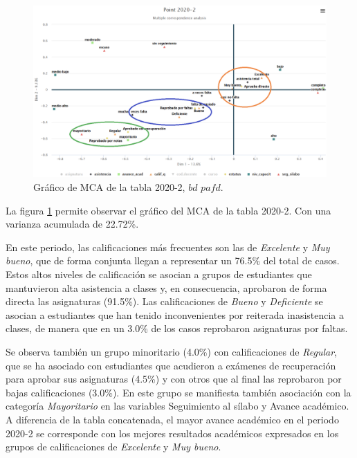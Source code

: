 \documentclass[mathematics,article,submit,moreauthors,pdftex]{mdpi}
\begin{document}
\begin{figure}[H]


\begin{center}\includegraphics[width=0.9\linewidth,]{point_2022_2} \end{center}

\caption{Gráfico de MCA de la tabla 2020-2, $bd$ $pafd$.}
\label{fig:point_2022_2}
\end{figure}

La figura \ref{fig:point_2022_2} permite observar el gráfico del MCA de
la tabla 2020-2. Con una varianza acumulada de 22.72\%.

En este periodo, las calificaciones más frecuentes son las de
\emph{Excelente} y \emph{Muy bueno}, que de forma conjunta llegan a
representar un 76.5\% del total de casos. Estos altos niveles de
calificación se asocian a grupos de estudiantes que mantuvieron alta
asistencia a clases y, en consecuencia, aprobaron de forma directa las
asignaturas (91.5\%). Las calificaciones de \emph{Bueno} y
\emph{Deficiente} se asocian a estudiantes que han tenido inconvenientes
por reiterada inasistencia a clases, de manera que en un 3.0\% de los
casos reprobaron asignaturas por faltas.

Se observa también un grupo minoritario (4.0\%) con calificaciones de
\emph{Regular}, que se ha asociado con estudiantes que acudieron a
exámenes de recuperación para aprobar sus asignaturas (4.5\%) y con
otros que al final las reprobaron por bajas calificaciones (3.0\%). En
este grupo se manifiesta también asociación con la categoría
\emph{Mayoritario} en las variables Seguimiento al sílabo y Avance
académico. A diferencia de la tabla concatenada, el mayor avance
académico en el periodo 2020-2 se corresponde con los mejores resultados
académicos expresados en los grupos de calificaciones de
\emph{Excelente} y \emph{Muy bueno}.
\end{document}
